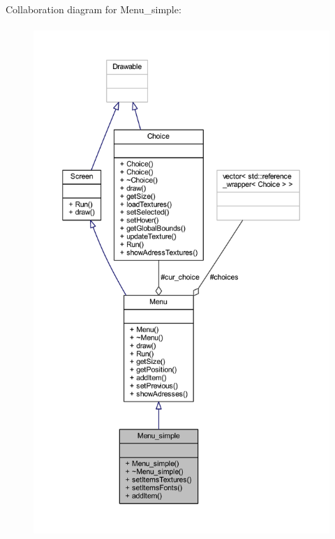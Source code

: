 Collaboration diagram for Menu\+\_\+simple\+:\nopagebreak
\begin{figure}[H]
\begin{center}
\leavevmode
\includegraphics[height=550pt]{class_menu__simple__coll__graph}
\end{center}
\end{figure}
